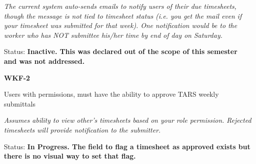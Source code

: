 \noindent \textit{The current system auto-sends emails to notify users of their due timesheets, though the message is not tied to timesheet status (i.e. you get the mail even if your timesheet was submitted for that week). One notification would be to the worker who has NOT submittee his/her time by end of day on Saturday.}

\noindent Status: \textbf{Inactive.  This was declared out of the scope of this semester and was not addressed.}\\

\noindent 

\noindent \textbf{WKF-2}

\noindent Users with permissions, must have the ability to approve TARS weekly submittals

\noindent \textit{Assumes ability to view other's timesheets based on your role permission. Rejected timesheets will provide notification to the submitter.}

\noindent Status: \textbf{In Progress.  The field to flag a timesheet as approved exists but there is no visual way to set that flag.}
